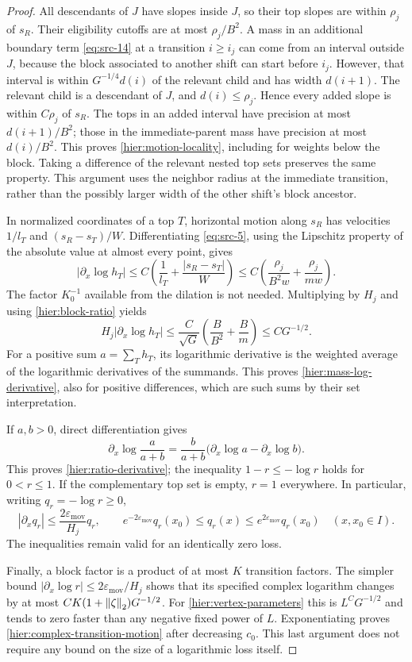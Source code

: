 \begin{proof}
All descendants of $J$ have slopes inside $J$, so their top slopes are
within $\rho_j$ of $s_R$.  Their eligibility cutoffs are at most
$\rho_j/B^2$.  A mass in an additional boundary term
\eqref{eq:src-14} at a transition $i\ge i_j$ can come from an interval
outside $J$, because the block associated to another shift can start
before $i_j$.  However, that interval is within
$G^{-1/4}d(i)$ of the relevant child and has width $d(i+1)$.
The relevant child is a descendant of $J$, and $d(i)\le\rho_j$.
Hence every added slope is within $C\rho_j$ of $s_R$.  The tops in an
added interval have precision at most $d(i+1)/B^2$; those in the
immediate-parent mass have precision at most $d(i)/B^2$.
This proves \eqref{hier:motion-locality}, including for weights below
the block.  Taking a difference of the relevant nested top sets preserves
the same property.  This argument uses the neighbor radius at the
immediate transition, rather than the possibly larger width of the other
shift's block ancestor.

In normalized coordinates of a top $T$, horizontal motion along $s_R$
has velocities $1/l_T$ and $(s_R-s_T)/W$.  Differentiating
\eqref{eq:src-5}, using the Lipschitz property of the absolute value at
almost every point, gives
\[
 |\partial_x\log h_T|
 \le C\left(\frac1{l_T}+\frac{|s_R-s_T|}{W}\right)
 \le C\left(\frac{\rho_j}{B^2w}+\frac{\rho_j}{mw}\right).
\]
The factor $K_0^{-1}$ available from the dilation is not needed.
Multiplying by $H_j$ and using \eqref{hier:block-ratio} yields
\[
 H_j|\partial_x\log h_T|
 \le\frac C{\sqrt G}
       \left(\frac{B}{B^2}+\frac Bm\right)
 \le C G^{-1/2}.
\]
For a positive sum $a=\sum_T h_T$, its logarithmic derivative is the
weighted average of the logarithmic derivatives of the summands.
This proves \eqref{hier:mass-log-derivative}, also for positive
differences, which are such sums by their set interpretation.

If $a,b>0$, direct differentiation gives
\[
 \partial_x\log\frac a{a+b}
 =\frac b{a+b}\bigl(\partial_x\log a-\partial_x\log b\bigr).
\]
This proves \eqref{hier:ratio-derivative}; the inequality
$1-r\le-\log r$ holds for $0<r\le1$.  If the complementary top set is
empty, $r=1$ everywhere.  In particular, writing $q_r=-\log r\ge0$,
\begin{equation}
 |\partial_x q_r|\le\frac{2\varepsilon_{\mathrm{mov}}}{H_j}q_r,
 \qquad
 e^{-2\varepsilon_{\mathrm{mov}}}q_r(x_0)
 \le q_r(x)\le e^{2\varepsilon_{\mathrm{mov}}}q_r(x_0)
 \quad(x,x_0\in I).
 \label{hier:loss-motion}
\end{equation}
The inequalities remain valid for an identically zero loss.

Finally, a block factor is a product of at most $K$ transition factors.
The simpler bound $|\partial_x\log r|\le2\varepsilon_{\mathrm{mov}}/H_j$ shows that
its specified complex logarithm changes by at most
$C K(1+\left\|\zeta\right\|_2)G^{-1/2}$.  For
\eqref{hier:vertex-parameters} this is $L^C G^{-1/2}$ and tends to zero
faster than any negative fixed power of $L$.  Exponentiating proves
\eqref{hier:complex-transition-motion} after decreasing $c_0$.
This last argument does not require any bound on the size of a
logarithmic loss itself.
\end{proof}

